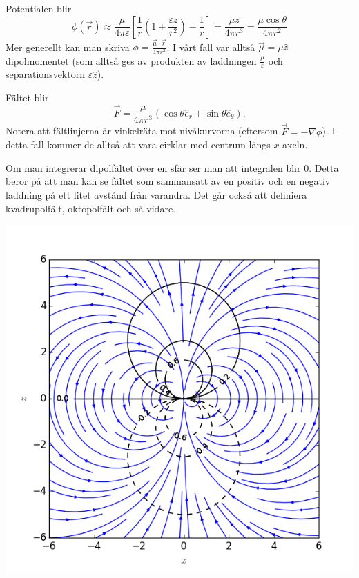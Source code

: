 \documentclass[%
oneside,                 %
final,                   %
10pt]{article}
\begin{document}
Potentialen blir
\begin{equation}
\phi(\vec{r})\approx\frac{\mu}{4\pi\varepsilon}\left[\frac{1}{r}\left(1+\frac{\varepsilon z}{r^2}\right)-\frac{1}{r}\right]=\frac{\mu z}{4\pi r^3}=\frac{\mu\cos\theta}{4 \pi r^2}
\end{equation}
Mer generellt kan man skriva $\phi=\frac{\vec\mu\cdot\vec{r}}{4 \pi r^3}$. I vårt fall var alltså $\vec\mu=\mu\hat z$ dipolmomentet (som alltså ges av produkten av laddningen $\frac{\mu}{\varepsilon}$ och separationsvektorn $\varepsilon\hat z$).

Fältet blir
\begin{equation}
  \vec{F} = \frac{\mu}{4 \pi r^3} \left(\cos \theta \hat{e}_{r} + \sin \theta
\hat{e}_{\theta}\right).
\end{equation}
Notera att fältlinjerna är vinkelräta mot nivåkurvorna (eftersom $\vec{F} = -\nabla \phi$). I detta fall kommer de alltså att vara cirklar med centrum längs $x$-axeln.

Om man integrerar dipolfältet över en sfär ser man att integralen blir 0.  Detta beror på att man kan se fältet som sammansatt av en positiv och en negativ laddning på ett litet avstånd från varandra. Det går också att definiera kvadrupolfält, oktopolfält och så vidare.




\centerline{\includegraphics[width=0.8\linewidth]{fig/dipole_fieldplot.png}}





\printindex
\end{document}
